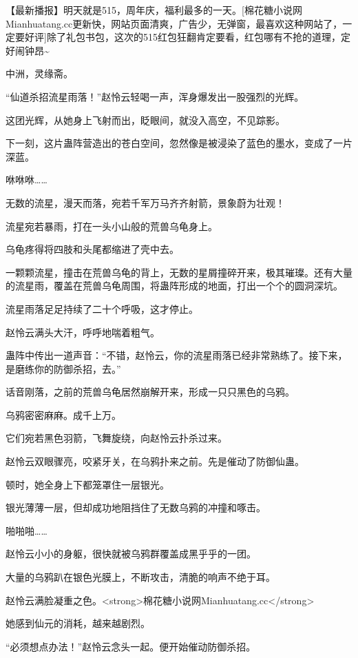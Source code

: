 
\begin{this_body}

【最新播报】明天就是515，周年庆，福利最多的一天。[棉花糖小说网Mianhuatang.cc更新快，网站页面清爽，广告少，无弹窗，最喜欢这种网站了，一定要好评]除了礼包书包，这次的515红包狂翻肯定要看，红包哪有不抢的道理，定好闹钟昂\~{}

中洲，灵缘斋。

“仙道杀招流星雨落！”赵怜云轻喝一声，浑身爆发出一股强烈的光辉。

这团光辉，从她身上飞射而出，眨眼间，就没入高空，不见踪影。

下一刻，这片蛊阵营造出的苍白空间，忽然像是被浸染了蓝色的墨水，变成了一片深蓝。

咻咻咻……

无数的流星，漫天而落，宛若千军万马齐齐射箭，景象蔚为壮观！

流星宛若暴雨，打在一头小山般的荒兽乌龟身上。

乌龟疼得将四肢和头尾都缩进了壳中去。

一颗颗流星，撞击在荒兽乌龟的背上，无数的星屑撞碎开来，极其璀璨。还有大量的流星雨，覆盖在荒兽乌龟周围，将蛊阵形成的地面，打出一个个的圆洞深坑。

流星雨落足足持续了二十个呼吸，这才停止。

赵怜云满头大汗，呼呼地喘着粗气。

蛊阵中传出一道声音：“不错，赵怜云，你的流星雨落已经非常熟练了。接下来，是磨练你的防御杀招，去。”

话音刚落，之前的荒兽乌龟居然崩解开来，形成一只只黑色的乌鸦。

乌鸦密密麻麻。成千上万。

它们宛若黑色羽箭，飞舞旋绕，向赵怜云扑杀过来。

赵怜云双眼骤亮，咬紧牙关，在乌鸦扑来之前。先是催动了防御仙蛊。

顿时，她全身上下都笼罩住一层银光。

银光薄薄一层，但却成功地阻挡住了无数乌鸦的冲撞和啄击。

啪啪啪……

赵怜云小小的身躯，很快就被乌鸦群覆盖成黑乎乎的一团。

大量的乌鸦趴在银色光膜上，不断攻击，清脆的响声不绝于耳。

赵怜云满脸凝重之色。<strong>棉花糖小说网Mianhuatang.cc</strong>

她感到仙元的消耗，越来越剧烈。

“必须想点办法！”赵怜云念头一起。便开始催动防御杀招。


\end{this_body}
